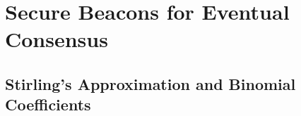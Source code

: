 \documentclass[11pt,oneside]{book}
\begin{document}
\part{Secure Beacons for Eventual Consensus}\label{part:xorgames}



\cite{}
\singlespacing
\newpage
{}
  


\appendix
{}

\chapter{Stirling's Approximation and Binomial Coefficients}\label{app:binomial-coeff}


% 

% 
\end{document}
